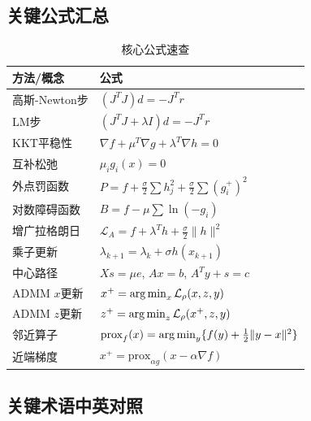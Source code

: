 \subsection{关键公式汇总}

\begin{table}[htbp]
\centering
\caption{核心公式速查}
\begin{tabular}{@{}ll@{}}
\toprule
\textbf{方法/概念} & \textbf{公式} \\
\midrule
高斯-Newton步 & $(J^T J) d = -J^T r$ \\
LM步 & $(J^T J + \lambda I) d = -J^T r$ \\
KKT平稳性 & $\nabla f + \mu^T \nabla g + \lambda^T \nabla h = 0$ \\
互补松弛 & $\mu_i g_i(x) = 0$ \\
外点罚函数 & $P = f + \frac{\sigma}{2}\sum h_j^2 + \frac{\sigma}{2}\sum (g_i^+)^2$ \\
对数障碍函数 & $B = f - \mu\sum \ln(-g_i)$ \\
增广拉格朗日 & $\mathcal{L}_A = f + \lambda^T h + \frac{\sigma}{2}\|h\|^2$ \\
乘子更新 & $\lambda_{k+1} = \lambda_k + \sigma h(x_{k+1})$ \\
中心路径 & $Xs = \mu e$, $Ax = b$, $A^T y + s = c$ \\
ADMM $x$更新 & $x^+ = \operatorname{arg\,min}_x \mathcal{L}_\rho(x, z, y)$ \\
ADMM $z$更新 & $z^+ = \operatorname{arg\,min}_z \mathcal{L}_\rho(x^+, z, y)$ \\
邻近算子 & $\text{prox}_f(x) = \operatorname{arg\,min}_y\{f(y) + \frac{1}{2}\|y-x\|^2\}$ \\
近端梯度 & $x^+ = \text{prox}_{\alpha g}(x - \alpha \nabla f)$ \\
\bottomrule
\end{tabular}
\end{table}

\subsection{关键术语中英对照}

